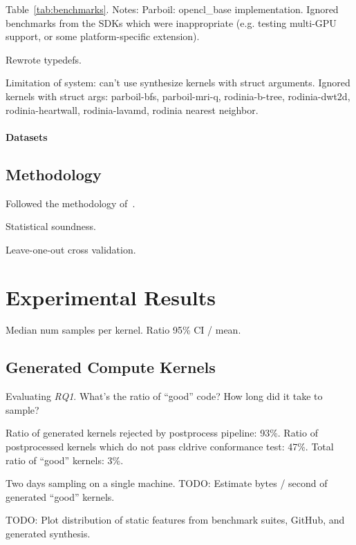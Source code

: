 \documentclass[preprint,nonatbib,10pt,nocopyrightspace]{sigplanconf}
\begin{document}
Table~\ref{tab:benchmarks}. Notes: Parboil: opencl\_base
implementation. Ignored benchmarks from the SDKs which were
inappropriate (e.g. testing multi-GPU support, or some
platform-specific extension).

Rewrote typedefs.

Limitation of system: can't use synthesize kernels with struct
arguments. Ignored kernels with struct args: %
parboil-bfs, %
parboil-mri-q, %
rodinia-b-tree, %
rodinia-dwt2d, %
rodinia-heartwall, %
rodinia-lavamd, %
rodinia nearest neighbor.


\paragraph{Datasets}


\subsection{Methodology}

Followed the methodology of~\cite{Grewe2013}.

Statistical soundness.

Leave-one-out cross validation.


\section{Experimental Results}\label{sec:evaluation}

Median num samples per kernel. Ratio 95\% CI / mean.


\subsection{Generated Compute Kernels}\label{subsec:}

Evaluating \emph{RQ1}. What's the ratio of ``good'' code? How long did
it take to sample?

Ratio of generated kernels rejected by postprocess pipeline:
93\%. Ratio of postprocessed kernels which do not pass cldrive
conformance test:
47\%. Total ratio of ``good'' kernels: 3\%.

Two days sampling on a single machine. TODO: Estimate bytes / second
of generated ``good'' kernels.

TODO: Plot distribution of static features from benchmark suites,
GitHub, and generated synthesis.
\end{document}
